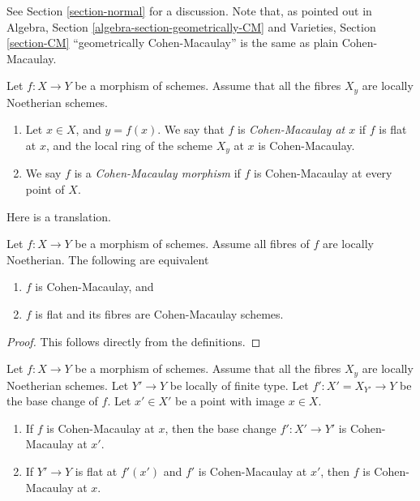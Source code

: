 \noindent
See Section \ref{section-normal} for a discussion.
Note that, as pointed out in
Algebra, Section \ref{algebra-section-geometrically-CM}
and
Varieties, Section \ref{section-CM}
``geometrically Cohen-Macaulay'' is the same as plain Cohen-Macaulay.

\begin{definition}
\label{definition-CM}
Let $f : X \to Y$ be a morphism of schemes.
Assume that all the fibres $X_y$ are locally Noetherian schemes.
\begin{enumerate}
\item Let $x \in X$, and $y = f(x)$. We say that $f$ is
{\it Cohen-Macaulay at $x$} if $f$ is flat at $x$, and the
local ring of the scheme $X_y$ at $x$ is Cohen-Macaulay.
\item We say $f$ is a {\it Cohen-Macaulay morphism} if $f$ is
Cohen-Macaulay at every point of $X$.
\end{enumerate}
\end{definition}

\noindent
Here is a translation.

\begin{lemma}
\label{lemma-CM}
Let $f : X \to Y$ be a morphism of schemes.
Assume all fibres of $f$ are locally Noetherian.
The following are equivalent
\begin{enumerate}
\item $f$ is Cohen-Macaulay, and
\item $f$ is flat and its fibres are Cohen-Macaulay schemes.
\end{enumerate}
\end{lemma}

\begin{proof}
This follows directly from the definitions.
\end{proof}

\begin{lemma}
\label{lemma-base-change-CM}
Let $f : X \to Y$ be a morphism of schemes.
Assume that all the fibres $X_y$ are locally Noetherian schemes.
Let $Y' \to Y$ be locally of finite type. Let $f' : X' = X_{Y'} \to Y$
be the base change of $f$.
Let $x' \in X'$ be a point with image $x \in X$.
\begin{enumerate}
\item If $f$ is Cohen-Macaulay at $x$, then the base change
$f' : X' \to Y'$ is Cohen-Macaulay at $x'$.
\item If $Y' \to Y$ is flat at $f'(x')$ and $f'$ is Cohen-Macaulay at
$x'$, then $f$ is Cohen-Macaulay at $x$.
\end{enumerate}
\end{lemma}

